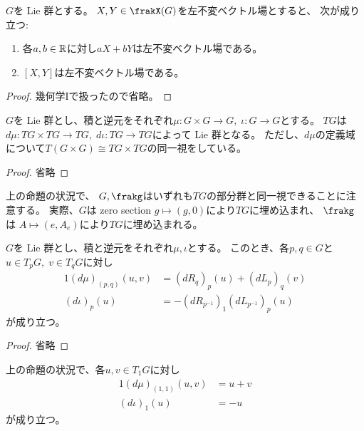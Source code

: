 \documentclass[report]{jlreq}
\begin{document}
\begin{lemma}
    $G$を Lie 群とする。
    $X, Y \in \frakX(G)$を左不変ベクトル場とすると、
    次が成り立つ:
    \begin{enumerate}
        \item 各$a, b \in \mathbb{R}$に対し$aX + bY$は左不変ベクトル場である。
        \item $[X, Y]$は左不変ベクトル場である。
    \end{enumerate}
\end{lemma}

\begin{proof}
    幾何学Iで扱ったので省略。
\end{proof}


\begin{proposition}[$TG$は Lie 群]
    $G$を Lie 群とし、積と逆元をそれぞれ$\mu \colon G \times G \to G,\; \iota \colon G \to G$とする。
    $TG$は$d\mu \colon TG \times TG \to TG,\; d\iota \colon TG \to TG$によって Lie 群となる。
    ただし、$d\mu$の定義域について$T(G \times G) \cong TG \times TG$の同一視をしている。
\end{proposition}

\begin{proof}
    省略
\end{proof}

\begin{remark}
    上の命題の状況で、
    $G, \frakg$はいずれも$TG$の部分群と同一視できることに注意する。
    実際、$G$は zero section $g \mapsto (g, 0)$により$TG$に埋め込まれ、
    $\frakg$は $A \mapsto (e, A_e)$により$TG$に埋め込まれる。
\end{remark}

\begin{proposition}[$TG$上の演算]
    $G$を Lie 群とし、積と逆元をそれぞれ$\mu, \iota$とする。
    このとき、各$p, q \in G$と$u \in T_pG,\; v \in T_qG$に対し
    \begin{alignat}{1}
        (d\mu)_{(p, q)}(u, v)
            &= (dR_q)_p(u) + (dL_p)_q(v) \\
        (d\iota)_p(u)
            &= - (dR_{p^{-1}})_{1} (dL_{p^{-1}})_p(u)
    \end{alignat}
    が成り立つ。
\end{proposition}

\begin{proof}
    省略
\end{proof}

\begin{corollary}[$T_1G$上の演算]
    上の命題の状況で、各$u, v \in T_1G$に対し
    \begin{alignat}{1}
        (d\mu)_{(1, 1)}(u, v) &= u + v \\
        (d\iota)_1(u) &= - u
    \end{alignat}
    が成り立つ。
\end{corollary}
\end{document}
